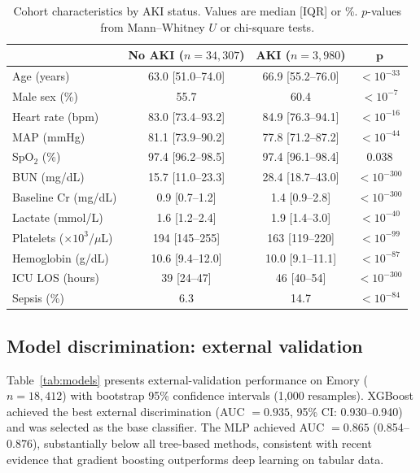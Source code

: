 \documentclass[12pt]{article}
\begin{document}
\begin{table}[htbp]
\centering
\caption{Cohort characteristics by AKI status.  Values are
median [IQR] or \%.  $p$-values from Mann--Whitney $U$ or
chi-square tests.}
\label{tab:cohort}
\footnotesize
\begin{tabular}{lccc}
\toprule
& \textbf{No AKI} ($n=34{,}307$) & \textbf{AKI} ($n=3{,}980$)
& $\bm{p}$ \\
\midrule
Age (years) & 63.0 [51.0--74.0] & 66.9 [55.2--76.0]
  & $< 10^{-33}$ \\
Male sex (\%) & 55.7 & 60.4
  & $< 10^{-7}$ \\
Heart rate (bpm) & 83.0 [73.4--93.2] & 84.9 [76.3--94.1]
  & $< 10^{-16}$ \\
MAP (mmHg) & 81.1 [73.9--90.2] & 77.8 [71.2--87.2]
  & $< 10^{-44}$ \\
SpO$_2$ (\%) & 97.4 [96.2--98.5] & 97.4 [96.1--98.4]
  & 0.038 \\
BUN (mg/dL) & 15.7 [11.0--23.3] & 28.4 [18.7--43.0]
  & $< 10^{-300}$ \\
Baseline Cr (mg/dL) & 0.9 [0.7--1.2] & 1.4 [0.9--2.8]
  & $< 10^{-300}$ \\
Lactate (mmol/L) & 1.6 [1.2--2.4] & 1.9 [1.4--3.0]
  & $< 10^{-40}$ \\
Platelets ($\times 10^3$/$\mu$L)
  & 194 [145--255] & 163 [119--220]
  & $< 10^{-99}$ \\
Hemoglobin (g/dL) & 10.6 [9.4--12.0] & 10.0 [9.1--11.1]
  & $< 10^{-87}$ \\
ICU LOS (hours) & 39 [24--47] & 46 [40--54]
  & $< 10^{-300}$ \\
Sepsis (\%) & 6.3 & 14.7
  & $< 10^{-84}$ \\
\bottomrule
\end{tabular}
\end{table}

\subsection{Model discrimination: external validation}
\label{sec:model_results}

Table~\ref{tab:models} presents external-validation performance
on Emory ($n = 18{,}412$) with bootstrap 95\% confidence
intervals (1{,}000 resamples).  XGBoost achieved the best
external discrimination (AUC $= 0.935$, 95\% CI: 0.930--0.940)
and was selected as the base classifier.  The MLP achieved
AUC $= 0.865$ (0.854--0.876), substantially below all tree-based
methods, consistent with recent evidence that gradient boosting
outperforms deep learning on tabular
data.\cite{grinsztajn2022tree}
\end{document}
